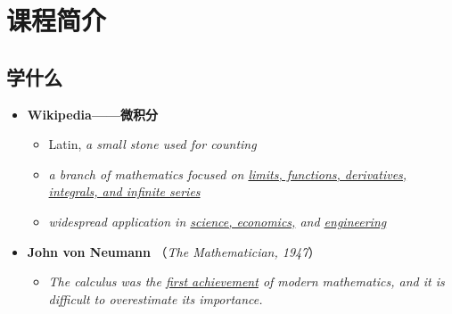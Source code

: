 \section{课程简介}

\subsection{学什么}

\begin{itemize}
	  \item {\bf Wikipedia——微积分} 
	\begin{itemize}
	  \item Latin, {\it a small stone used for counting}  
	  \item {\it a branch of mathematics focused on \underline{limits, functions,
	  	derivatives, integrals, and infinite series}} 
  	  \item {\it widespread application in \underline{science, economics,} 
  	  and \underline{engineering}} 
	\end{itemize}
	\item {\bf John von Neumann} （{\small\it The Mathematician, 1947}）
	\begin{itemize}
	  \item {\it The calculus was the \underline{first achievement} of modern
	  mathematics, and it is difficult to overestimate its importance.}
	\end{itemize} 
\end{itemize}

\begin{center}
\end{center}

